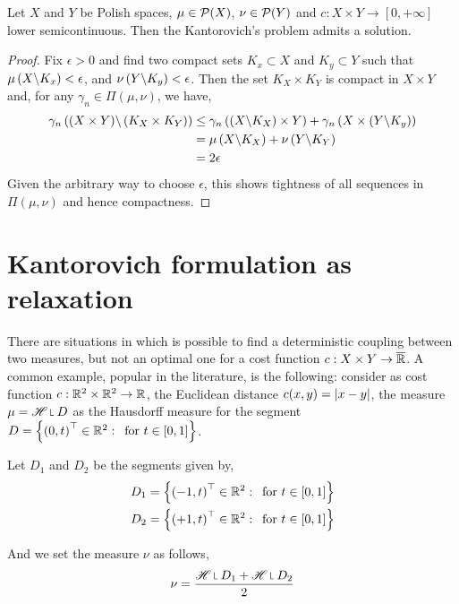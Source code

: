 \begin{lemma}
	Let $X$ and $Y$ be Polish spaces, $\mu\in\mathcal{P}(X)$, $\nu \in \mathcal{P}(Y)$ and $c:X\times Y \rightarrow [0,+\infty]$ lower semicontinuous. Then the Kantorovich's problem admits a solution.
\end{lemma}

\begin{proof}
Fix $\epsilon>0$ and find two compact sets $K_x\subset X$ and $K_y\subset Y$ such that $\mu\left( X\backslash K_x \right)<\epsilon$, and $\nu\left( Y\backslash K_y \right)<\epsilon$. Then the set $K_X\times K_Y$ is compact in $X\times Y$ and, for any $\gamma_n\in \Pi(\mu, \nu)$, we have,
\begin{align}
	\gamma_n\left( (X\times Y)\backslash \left( K_X\times K_Y \right) \right)&\leq \gamma_n\left( (X\backslash K_X)\times Y \right)+\gamma_n\left( X\times \left( Y\backslash K_y \right) \right)\\&=\mu\left( X\backslash K_X \right)+\nu\left( Y\backslash K_Y \right)\\&=2\epsilon
\end{align}  
Given the arbitrary way to choose $\epsilon$, this shows tightness of all sequences in $\Pi(\mu, \nu)$ and hence compactness.
\end{proof}

\section{Kantorovich formulation as relaxation}

There are situations in which is possible to find a deterministic coupling between two measures, but not an optimal one for a cost function $c:X\times Y \rightarrow \overline{\mathbb{R}}$. A common example, popular in the literature, is the following: consider as cost function $c:\mathbb{R}^2\times\mathbb{R}^2 \rightarrow \mathbb{R}$, the Euclidean distance $c(x,y)=\left| x-y \right|$, the measure $\mu=\Hausdorff\measurerestr D$ as the Hausdorff measure for the segment  $D=\left\lbrace \left( 0, t \right)^\top \in \mathbb{R}^2:\, \text{ for } t\in [0,1] \right\rbrace$. 

Let $D_1$ and $D_2$ be the segments given by,
\begin{align*}
D_1 = \left\lbrace \left( -1, t \right)^\top\in\mathbb{R}^2:\, \text{ for } t\in [0,1] \right\rbrace \\
D_2 = \left\lbrace \left( +1, t \right)^\top\in\mathbb{R}^2:\, \text{ for } t\in [0,1] \right\rbrace
\end{align*}

And we set the measure $\nu$ as follows, 
\begin{equation*}
\nu=\frac{\Hausdorff\measurerestr D_1 + \Hausdorff \measurerestr D_2}{2}
\end{equation*}

